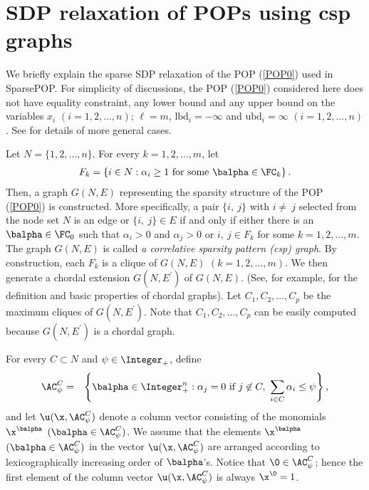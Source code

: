 \section{SDP relaxation of POPs using csp graphs} \label{sec:csp}

We briefly explain
the sparse SDP relaxation of the POP (\ref{POP0})
used in SparsePOP.  For simplicity of discussions, 
the POP (\ref{POP0}) considered here  does not have
equality constraint, any lower bound and any upper bound on the variables $x_i$ $(i=1,2,\ldots,n)$; 
$\ell = m$, $\mbox{lbd}_i = -\infty$ and $\mbox{ubd}_i = \infty$ $(i=1,2,\ldots,n)$. 
See \cite{WAKI04} for details of more general cases.

Let $N = \{1,2,\ldots,n\}$. 
For every $k=1,2,\ldots,m$, let 
\begin{eqnarray*}
      F_k = \left\{ i \in N : \alpha_i \geq 1 \ \mbox{for some }  \balpha \in \FC_k \right\}.
\end{eqnarray*}
Then, a graph $G(N,E)$ 
representing the sparsity structure of
the POP (\ref{POP0}) is constructed. More specifically, 
a pair $\{i, \ j\}$ with $i \neq \ j$ selected from
the node set $N$ 
is an edge or $\{i, \ j\} \in E$ if and only if either there is an $\balpha \in \FC_0$ such that
$\alpha_i > 0$ and $\alpha_j > 0$ or $i, \ j \in F_k$ for some $k=1,2,\ldots,m$.
The graph $G(N, E)$ is called 
\textit{a correlative sparsity pattern (csp) graph}.
By construction, each $F_k$ is a clique of $G(N,E)$ $(k=1,2,\ldots,m)$.
We then generate a chordal extension $G(N,E^{\prime})$ of $G(N,E)$.
(See, for example, \cite{BLAIR93} for the definition and basic properties of chordal graphs). 
Let $C_1,C_2,\ldots,C_p$ be the maximum cliques of $G(N, E^{\prime})$. 
Note that  $C_1,C_2,\ldots,C_p$ can  be easily computed because 
$G(N, E^{\prime})$ is a chordal graph.

For every 
$C \subset N$ and $\psi \in \Integer_+$, define 
\begin{eqnarray*}
\AC_{\psi}^C & = & 
\left\{ \balpha \in \Integer^n_+ : 
\alpha_j = 0 \ \mbox{if } j \not\in C, \
\sum_{i \in C} \alpha_i \leq \psi
 \right\}, 
\end{eqnarray*}
and let $\u(\x,\AC_{\psi}^C)$ denote a column vector consisting of 
the monomials $\x^{\balpha}$ $(\balpha \in \AC_{\psi}^C)$. We assume 
that the elements $\x^{\balpha}$ $(\balpha \in \AC_{\psi}^C)$ in the vector
$\u(\x,\AC_{\psi}^C)$ are arranged according to  lexicographically  
increasing order of $\balpha$'s. Notice that $\0 \in \AC_{\psi}^C$;
hence the first element of the column vector 
$\u(\x,\AC_{\psi}^C)$ is always $\x^{\0} = 1$. 

